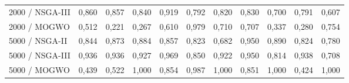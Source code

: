 \begin{table}[htbp]
\begin{tabular}{l c c c c c c c c c c }
        2000 / NSGA-III & 0{,}860 & 0{,}857 & 0{,}840 & 0{,}919 & 0{,}792 & 0{,}820 & 0{,}830 & 0{,}700 & 0{,}791 & 0{,}607 \\
        2000 / MOGWO & 0{,}512 & 0{,}221 & 0{,}267 & 0{,}610 & 0{,}979 & 0{,}710 & 0{,}707 & 0{,}337 & 0{,}280 & 0{,}754 \\
        5000 / NSGA-II & 0{,}844 & 0{,}873 & 0{,}884 & 0{,}857 & 0{,}823 & 0{,}682 & 0{,}950 & 0{,}890 & 0{,}824 & 0{,}780 \\
        5000 / NSGA-III & 0{,}936 & 0{,}936 & 0{,}927 & 0{,}969 & 0{,}850 & 0{,}922 & 0{,}950 & 0{,}814 & 0{,}938 & 0{,}708 \\
        5000 / MOGWO & 0{,}439 & 0{,}522 & 1{,}000 & 0{,}854 & 0{,}987 & 1{,}000 & 0{,}851 & 1{,}000 & 0{,}424 & 1{,}000 \\
        \hline
    \end{tabular}
\end{table}
